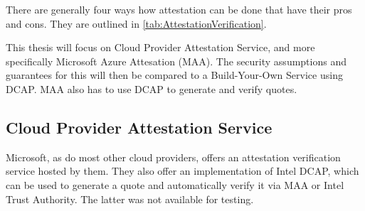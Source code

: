 There are generally four ways how attestation can be done that have their pros and cons. They are outlined in \cref{tab:AttestationVerification}. 
\begin{table}
\centering
{}
\caption{Overview of four different Attestation Verification methods}
\label{tab:AttestationVerification}
\end{table}
This thesis will focus on Cloud Provider Attestation Service, and more specifically Microsoft Azure Attesation (MAA). The security assumptions and guarantees for this will then be compared to a Build-Your-Own Service using DCAP. MAA also has to use DCAP to generate and verify quotes.

\subsection{Cloud Provider Attestation Service}
 Microsoft, as do most other cloud providers, offers an attestation verification service hosted by them. They also offer an implementation of Intel DCAP, which can be used to generate a quote and automatically verify it via MAA or Intel Trust Authority. The latter was not available for testing.


